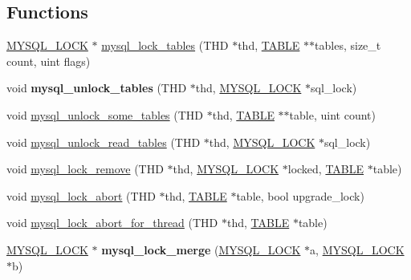 \subsection*{Functions}
\begin{DoxyCompactItemize}
\item 
\mbox{\hyperlink{structst__mysql__lock}{M\+Y\+S\+Q\+L\+\_\+\+L\+O\+CK}} $\ast$ \mbox{\hyperlink{group__Locking_ga40d9de997ac2ee4f94f358ce1ac2d76a}{mysql\+\_\+lock\+\_\+tables}} (T\+HD $\ast$thd, \mbox{\hyperlink{structTABLE}{T\+A\+B\+LE}} $\ast$$\ast$tables, size\+\_\+t count, uint flags)
\item 
\mbox{\label{group__Locking_ga2bff80304c9d27f634976ac8fe60cd38}} 
void {\bfseries mysql\+\_\+unlock\+\_\+tables} (T\+HD $\ast$thd, \mbox{\hyperlink{structst__mysql__lock}{M\+Y\+S\+Q\+L\+\_\+\+L\+O\+CK}} $\ast$sql\+\_\+lock)
\item 
void \mbox{\hyperlink{group__Locking_gafad092ec9a399db99abd75b57a9ee679}{mysql\+\_\+unlock\+\_\+some\+\_\+tables}} (T\+HD $\ast$thd, \mbox{\hyperlink{structTABLE}{T\+A\+B\+LE}} $\ast$$\ast$table, uint count)
\item 
void \mbox{\hyperlink{group__Locking_ga1e24a131cbe030c49d953669f804877d}{mysql\+\_\+unlock\+\_\+read\+\_\+tables}} (T\+HD $\ast$thd, \mbox{\hyperlink{structst__mysql__lock}{M\+Y\+S\+Q\+L\+\_\+\+L\+O\+CK}} $\ast$sql\+\_\+lock)
\item 
void \mbox{\hyperlink{group__Locking_gad40fe56766e1b54e2fed60814aec1e58}{mysql\+\_\+lock\+\_\+remove}} (T\+HD $\ast$thd, \mbox{\hyperlink{structst__mysql__lock}{M\+Y\+S\+Q\+L\+\_\+\+L\+O\+CK}} $\ast$locked, \mbox{\hyperlink{structTABLE}{T\+A\+B\+LE}} $\ast$table)
\item 
void \mbox{\hyperlink{group__Locking_ga07896e99c9c248c6441be5c13c484303}{mysql\+\_\+lock\+\_\+abort}} (T\+HD $\ast$thd, \mbox{\hyperlink{structTABLE}{T\+A\+B\+LE}} $\ast$table, bool upgrade\+\_\+lock)
\item 
void \mbox{\hyperlink{group__Locking_gad2320fa808c9d6523790e796d57e2331}{mysql\+\_\+lock\+\_\+abort\+\_\+for\+\_\+thread}} (T\+HD $\ast$thd, \mbox{\hyperlink{structTABLE}{T\+A\+B\+LE}} $\ast$table)
\item 
\mbox{\label{group__Locking_gae8e0ecd1f7872040079f5319aacd93a2}} 
\mbox{\hyperlink{structst__mysql__lock}{M\+Y\+S\+Q\+L\+\_\+\+L\+O\+CK}} $\ast$ {\bfseries mysql\+\_\+lock\+\_\+merge} (\mbox{\hyperlink{structst__mysql__lock}{M\+Y\+S\+Q\+L\+\_\+\+L\+O\+CK}} $\ast$a, \mbox{\hyperlink{structst__mysql__lock}{M\+Y\+S\+Q\+L\+\_\+\+L\+O\+CK}} $\ast$b)

\end{DoxyCompactItemize}
